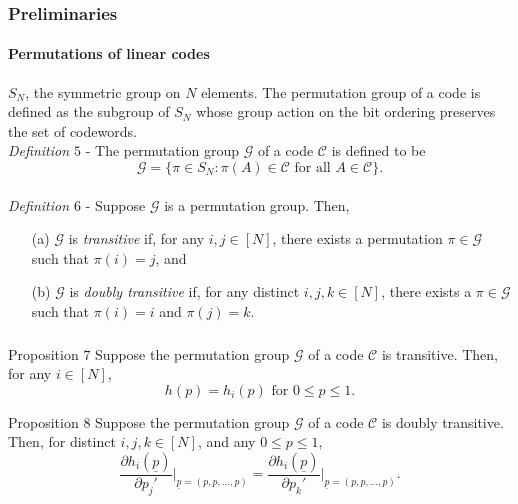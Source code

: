 \documentclass[xcolor=dvipsnames]{beamer}
\begin{document}
\begin{frame}
\frametitle{Preliminaries}
\framesubtitle{Permutations of linear codes}
$S_N$, the symmetric group on $N$ elements. The permutation group of a code is defined as the subgroup of $S_N$ whose group action on the bit ordering preserves the set of codewords.\\
\vspace{1cm}
\emph{Definition $5$} - The permutation group $\mathcal{G}$ of a code $\mathcal{C}$ is defined to be $$\mathcal{G} = \{\pi \in S_N : \pi(A) \in \mathcal{C} \text{ for all } A \in \mathcal{C}\}.$$\\
\emph{Definition $6$} - Suppose $\mathcal{G}$ is a permutation group. Then,
\begin{enumerate}
\item[(a)]$\mathcal{G}$ is \emph{transitive} if, for any $i,j \in [N]$, there exists a permutation $\pi \in \mathcal{G}$ such that $\pi(i)=j$, and
\item[(b)] $\mathcal{G}$ is \emph{doubly transitive} if, for any distinct $i,j,k \in [N]$, there exists a $\pi \in \mathcal{G}$ such that $\pi(i)=i$ and $\pi(j)=k$.
\end{enumerate}
\end{frame}

\begin{frame}
\frametitle{}
\begin{block}{Proposition $7$}
Suppose the permutation group $\mathcal{G}$ of a code $\mathcal{C}$ is transitive. Then, for any $i \in [N]$, $$h(p) = h_i(p) \text{ for } 0 \le p\le 1.$$
\end{block}
\begin{block}{Proposition $8$}
Suppose the permutation group $\mathcal{G}$ of a code $\mathcal{C}$ is doubly transitive. Then, for distinct $i,j,k \in [N]$, and any $0 \le p \le 1$, $$\frac{\partial h_i(\underline{p})}{\partial p_j'}\Bigg|_{\underline{p}=(p,p,\ldots,p)} = \frac{\partial h_i(\underline{p})}{\partial p_k'}\Bigg|_{\underline{p}=(p,p,\ldots,p)}.$$

\end{block}
\end{frame}
\end{document}
